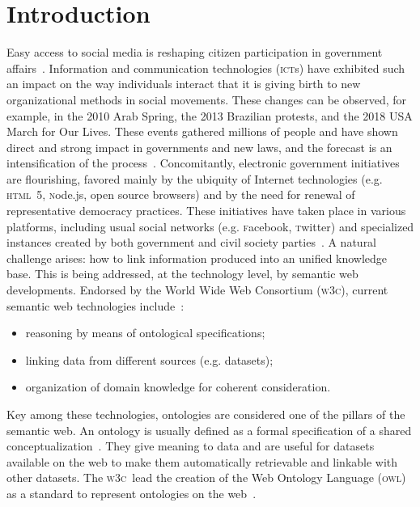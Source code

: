 \documentclass[10pt,letterpaper]{article}
\newcommand{\owl}{\textsc{owl}}
\newcommand{\ict}{\textsc{ict}}
\newcommand{\html}{\textsc{html}}
\newcommand{\node}{\textsc{n}ode.js}
\newcommand{\facebook}{\textsc{f}acebook}
\newcommand{\twitter}{\textsc{t}witter}
\newcommand{\wwwc}{\textsc{w3c}}
\begin{document}
\section{Introduction}\label{sec:into}
Easy access to social media is reshaping citizen participation in government affairs~\cite{socMed}. 
Information and communication technologies (\ict s) have exhibited such an impact on the way individuals interact
that it is giving birth to new organizational methods in social movements.
These changes can be observed, for example, in the 2010 Arab Spring, the 2013 Brazilian protests,
and the 2018 USA March for Our Lives.
These events gathered millions of people and
have shown direct and strong impact in governments and new laws,
and the forecast is an intensification of the process~\cite{digRev1,digRev3,digRev4}.
Concomitantly, electronic government initiatives are flourishing,
favored mainly by the ubiquity of Internet technologies (e.g. \html\ 5, \node, open source browsers)
and by the need for renewal of representative democracy practices. 
These initiatives have taken place in various platforms, including usual social networks (e.g. \facebook, \twitter)
and specialized instances created by both government and civil society parties~\cite{socMed,pita2010arquitetura,barros2010alem,knowledge}.
A natural challenge arises: how to link information produced into an unified knowledge base.
This is being addressed, at the technology level, by semantic web developments.
Endorsed by the World Wide Web Consortium (\wwwc), current semantic web technologies include~\cite{Sem1}:
\begin{itemize}
    \item reasoning by means of ontological specifications;
    \item linking data from different sources (e.g. datasets);
    \item organization of domain knowledge for coherent consideration.
\end{itemize}
\noindent Key among these technologies, ontologies are considered one of the pillars of the semantic web.
An ontology is usually defined as a formal specification of a shared conceptualization~\cite{gruber}.
They give meaning to data and are useful for datasets available on the web 
to make them automatically retrievable and linkable with other datasets.
The \wwwc\ lead the creation of the Web Ontology Language (\owl) as a standard to represent ontologies on the web~\cite{owl2}.
\end{document}
